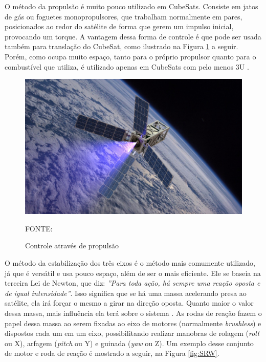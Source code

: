 \documentclass[
	12pt,				%
	openany,			%
	twoside,			%
	a4paper,			%
	english,			%
	french,				%
	spanish,			%
	brazil,				%
	oldfontcommands
	]{abntex2}
\begin{document}
O método da propulsão é muito pouco utilizado em CubeSats. Consiste em jatos de gás ou foguetes monopropulsores, que trabalham normalmente em pares, posicionados ao redor do satélite de forma que gerem um impulso inicial, provocando um torque. A vantagem dessa forma de controle é que pode ser usada também para translação do CubeSat, como ilustrado na Figura \ref{fig:Propulsion} a seguir. Porém, como ocupa muito espaço, tanto para o próprio propulsor quanto para o combustível que utiliza, é utilizado apenas em CubeSats com pelo menos 3U \cite{Luka}.

\begin{figure}[th]
	\caption{Controle através de propulsão}
	\centering
	\includegraphics[width=0.8\linewidth]{./figs/Propulsion}
	
	\begin{small}
		FONTE: \cite{Prop}
	\end{small}
	\label{fig:Propulsion}
\end{figure}

O método da estabilização dos três eixos é o método mais comumente utilizado, já que é versátil e usa pouco espaço, além de ser o mais eficiente. Ele se baseia na terceira Lei de Newton, que diz: \textit{''Para toda ação, há sempre uma reação oposta e de igual intensidade''}. Isso significa que se há uma massa acelerando presa ao satélite, ela irá forçar o mesmo a girar na direção oposta. Quanto maior o valor dessa massa, mais influência ela terá sobre o sistema \cite{Ericksson}. As rodas de reação fazem o papel dessa massa ao serem fixadas ao eixo de motores (normalmente \textit{brushless}) e dispostos cada um em um eixo, possibilitando realizar manobras de rolagem (\textit{roll} ou X), arfagem (\textit{pitch} ou Y) e guinada (\textit{yaw} ou Z). Um exemplo desse conjunto de motor e roda de reação é mostrado a seguir, na Figura \ref{fig:SRW}.
\end{document}
